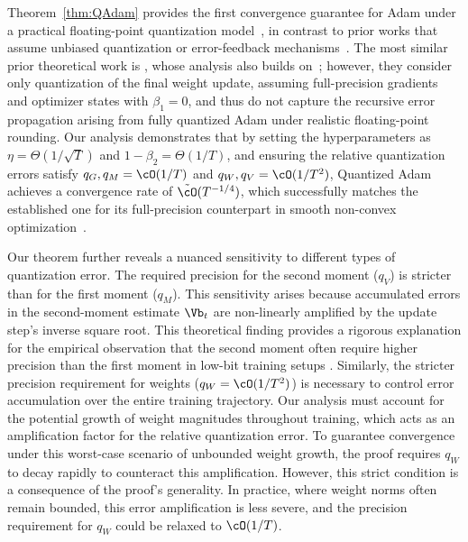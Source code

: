 \documentclass[11pt, letterpaper]{article}
\begin{document}
Theorem~\ref{thm:QAdam} provides the first convergence guarantee for Adam under a practical floating-point quantization model~\citep{peng2023fp8,liu2024deepseek,fishman2025scaling}, in contrast to prior works that assume unbiased quantization or error-feedback mechanisms~\citep{jiang2018qsgd,chen2021quantized,modoranu2024microadam}. The most similar prior theoretical work is \citet{ozkara2025stochastic}, whose analysis also builds on~\citet{defossez2022a}; however, they consider only quantization of the final weight update, assuming full-precision gradients and optimizer states with $\beta_1 = 0$, and thus do not capture the recursive error propagation arising from fully quantized Adam under realistic floating-point rounding. Our analysis demonstrates that by setting the hyperparameters as $\eta=\Theta(1/\sqrt{T})$ and $1-\beta_2=\Theta(1/T)$, and ensuring the relative quantization errors satisfy $q_G, q_M = \cO(1/T)$ and $q_W, q_V = \cO(1/T^2)$, Quantized Adam achieves a convergence rate of $\tilde{\cO}(T^{-1/4})$, which successfully matches the established one for its full-precision counterpart in smooth non-convex optimization~\citep{guo2021novel,defossez2022a,wang2023closing,hong2024convergence}.



Our theorem further reveals a nuanced sensitivity to different types of quantization error. The required precision for the second moment ($q_V$) is stricter than for the first moment ($q_M$). This sensitivity arises because accumulated errors in the second-moment estimate $\Vb_t$ are non-linearly amplified by the update step's inverse square root. This theoretical finding provides a rigorous explanation for the empirical observation that the second moment often require higher precision than the first moment in low-bit training setups \citep{peng2023fp8,tao2024collage,fishman2025scaling}. Similarly, the stricter precision requirement for weights ($q_W = \cO(1/T^2)$) is necessary to control error accumulation over the entire training trajectory. Our analysis must account for the potential growth of weight magnitudes throughout training, which acts as an amplification factor for the relative quantization error. To guarantee convergence under this worst-case scenario of unbounded weight growth, the proof requires $q_W$ to decay rapidly to counteract this amplification. However, this strict condition is a consequence of the proof's generality. In practice, where weight norms often remain bounded, this error amplification is less severe, and the precision requirement for $q_W$ could be relaxed to $\cO(1/T)$.
\end{document}
